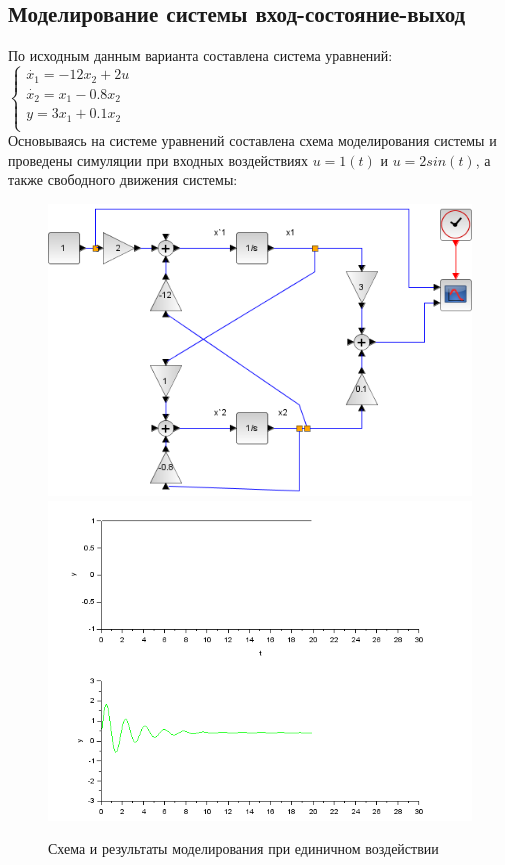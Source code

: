 \documentclass[a4paper,12pt,russian]{article} %
\begin{document}
\subsection{Моделирование системы вход-состояние-выход}
По исходным данным варианта составлена система уравнений:\\
$\begin{cases}\dot{x_1}=-12x_2+2u\\\dot{x_2}=x_1-0.8x_2\\y=3x_1+0.1x_2\\\end{cases}$\\
Основываясь на системе уравнений составлена схема моделирования системы и проведены симуляции при входных воздействиях $u=1(t)$ и $u=2sin(t)$, а также свободного движения системы:\\ 
\begin{figure}[H]
	\includegraphics[width=1\textwidth]{всв-схема}
	\includegraphics[width=1\textwidth]{всв-1}
	\caption{Схема и результаты моделирования при единичном воздействии}
\end{figure}
\end{document}
